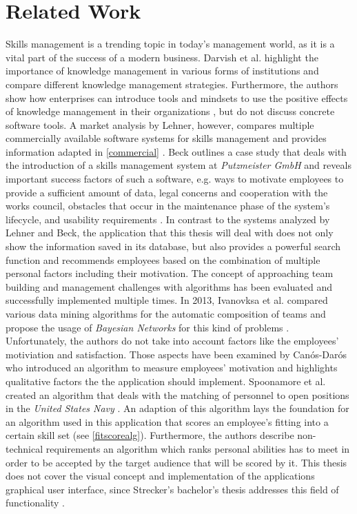 \chapter{Related Work}

Skills management is a trending topic in today's management world, as it is a vital part of the success of a modern business.
Darvish et al. highlight the importance of knowledge management in various forms of institutions and compare different knowledge management strategies.
Furthermore, the authors show how enterprises can introduce tools and mindsets to use the positive effects of knowledge management in their organizations \cite{darvish}, but do not discuss concrete software tools.
A market analysis by Lehner, however, compares multiple commercially available software systems for skills management and provides information adapted in \ref{commercial}  \cite{Marktanalyse}.
\newline
Beck outlines a case study that deals with the introduction of a skills management system at \textit{Putzmeister GmbH} and reveals important success factors of such a software, e.g. ways to motivate employees to provide a sufficient amount of data, legal concerns and cooperation with the works council, obstacles that occur in the maintenance phase of the system's lifecycle, and usability requirements \cite{beck}.
\newline
In contrast to the systems analyzed by Lehner and Beck, the application that this thesis will deal with does not only
show the information saved in its database, but also provides a powerful search function and recommends employees based on the combination of multiple personal factors including their motivation.
\newline
The concept of approaching team building and management challenges with algorithms has been evaluated and successfully implemented multiple times.
In 2013, Ivanovksa et al. compared various data mining algorithms for the automatic composition of teams and propose the usage of \textit{Bayesian Networks} for this kind of problems \cite{ivanovska}. Unfortunately, the authors do not take into account factors like the employees' motiviation and satisfaction. Those aspects have been examined by Canós-Darós who introduced an algorithm to measure employees' motivation \cite{CanosDaros2013} and highlights qualitative factors the the application should implement.
Spoonamore et al. created an algorithm that deals with the matching of personnel to open positions in the \textit{United States Navy} \cite{USN}. An adaption of this algorithm lays the foundation for an algorithm used in this application that scores an employee's fitting into a certain skill set (see \ref{fitscorealg}). Furthermore, the authors describe non-technical requirements an algorithm which ranks personal abilities has to
meet in order to be accepted by the target audience that will be scored by it.
\newline
This thesis does not cover the visual concept and implementation of the applications graphical user interface, since
Strecker's bachelor's thesis addresses this field of functionality \cite{strecker}.
